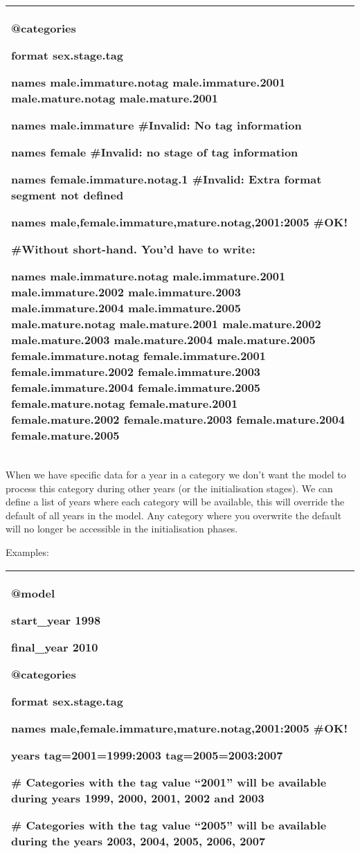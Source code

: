 \documentclass[a4paper,11pt,twoside,pdftex,draft]{article}
\begin{document}
\begin{longtable}[]{@{}l@{}}
\toprule
\endhead
\begin{minipage}[t]{0.97\columnwidth}\raggedright
@categories

format sex.stage.tag

names male.immature.notag male.immature.2001 male.mature.notag
male.mature.2001

names male.immature \#Invalid: No tag information

names female \#Invalid: no stage of tag information

names female.immature.notag.1 \#Invalid: Extra format segment not
defined

names male,female.immature,mature.notag,2001:2005 \#OK!

\#Without short-hand. You'd have to write:

names male.immature.notag male.immature.2001 male.immature.2002
male.immature.2003 male.immature.2004 male.immature.2005
male.mature.notag male.mature.2001 male.mature.2002 male.mature.2003
male.mature.2004 male.mature.2005 female.immature.notag
female.immature.2001 female.immature.2002 female.immature.2003
female.immature.2004 female.immature.2005 female.mature.notag
female.mature.2001 female.mature.2002 female.mature.2003
female.mature.2004 female.mature.2005\strut
\end{minipage}\tabularnewline
\bottomrule
\end{longtable}

When we have specific data for a year in a category we don't want the
model to process this category during other years (or the initialisation
stages). We can define a list of years where each category will be
available, this will override the default of all years in the model. Any
category where you overwrite the default will no longer be accessible in
the initialisation phases.

Examples:

\begin{longtable}[]{@{}l@{}}
\toprule
\endhead
\begin{minipage}[t]{0.97\columnwidth}\raggedright
@model

start\_year 1998

final\_year 2010

@categories

format sex.stage.tag

names male,female.immature,mature.notag,2001:2005 \#OK!

years tag=2001=1999:2003 tag=2005=2003:2007

\# Categories with the tag value ``2001'' will be available during years
1999, 2000, 2001, 2002 and 2003

\# Categories with the tag value ``2005'' will be available during the
years 2003, 2004, 2005, 2006, 2007\strut
\end{minipage}\tabularnewline
\bottomrule
\end{longtable}
\end{document}

